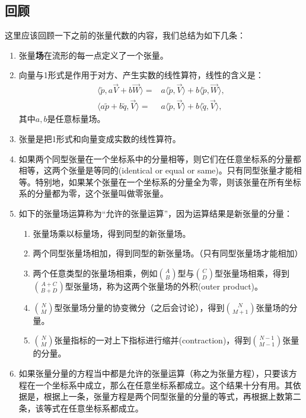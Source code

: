 \subsection*{回顾}
这里应该回顾一下之前的张量代数的内容，我们总结为如下几条：
\begin{enumerate}
    \item 张量\textbf{场}在流形的每一点定义了一个张量。
    \item 向量与1形式是作用于对方、产生实数的线性算符，线性的含义是：
    \begin{align*}
        \langle \tilde{p}, a\vec{V} + b\vec{W} \rangle = & a \langle \tilde{p}, \vec{V} \rangle + b \langle \tilde{p}, \vec{W} \rangle, \\
        \langle a \tilde{p} + b\tilde{q}, \vec{V} \rangle =& a \langle \tilde{p}, \vec{V} \rangle + b \langle \tilde{q}, \vec{V} \rangle,
    \end{align*}
    其中$a, b$是任意标量场。
    \item 张量是把1形式和向量变成实数的线性算符。
    \item 如果两个同型张量在一个坐标系中的分量相等，则它们在任意坐标系的分量都相等，这两个张量是等同的(identical or equal or same)。只有同型张量才能相等。特别地，如果某个张量在一个坐标系的分量全为零，则该张量在所有坐标系的分量都为零，这个张量叫做零张量。
    \item 如下的张量场运算称为“允许的张量运算”，因为运算结果是新张量的分量：
    \begin{enumerate}
        \item 张量场乘以标量场，得到同型的新张量场。
        \item 两个同型张量场相加，得到同型的新张量场。（只有同型张量场才能相加）
        \item 两个任意类型的张量场相乘，例如$\binom{A}{B}$型与$\binom{C}{D}$型张量场相乘，得到$\binom{A+C}{B+D}$型张量场，称为这两个张量场的外积(outer product)。
        \item $\binom{N}{M}$型张量场分量的协变微分（之后会讨论），得到$\binom{N}{M+1}$张量场的分量。
        \item $\binom{N}{M}$张量指标的一对上下指标进行缩并(contraction)，得到$\binom{N-1}{M-1}$张量的分量。
    \end{enumerate}
    \item 如果张量分量的方程当中都是允许的张量运算（称之为张量方程），只要该方程在一个坐标系中成立，那么在任意坐标系都成立。这个结果十分有用。其依据是，根据上一条，张量方程是两个同型张量的分量的等式，再根据上数第二条，该等式在任意坐标系都成立。
\end{enumerate}


